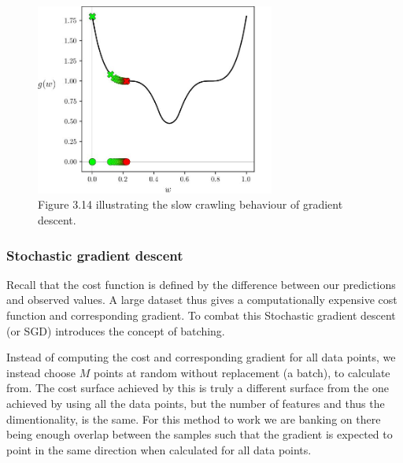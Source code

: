 \documentclass{article}
\theoremstyle{definition}
\begin{document}
\begin{figure}[H]
    \centering
    \includegraphics[width=0.7\textwidth]{Project2/figures/Gradient_descent_saddle_crawl.jpeg}
    \caption{Figure 3.14 \parencite[p.~70]{MLRefined} illustrating the slow crawling behaviour
of gradient descent.}
    \label{fig:CrawlGradientDescent}
\end{figure}

\subsubsection{Stochastic gradient descent}
Recall that the cost function is defined by the difference between our predictions and observed values. A large dataset thus gives a computationally expensive cost function and corresponding gradient. To combat this Stochastic gradient descent (or SGD) introduces the concept of batching.


Instead of computing the cost and corresponding gradient for all data points, we instead choose $M$ points at random without replacement (a batch), to calculate from. The cost surface achieved by this is truly a different surface from the one achieved by using all the data points, but the number of features and thus the dimentionality, is the same. For this method to work we are banking on there being enough overlap between the samples such that the gradient is expected to point in the same direction when calculated for all data points.
\end{document}
